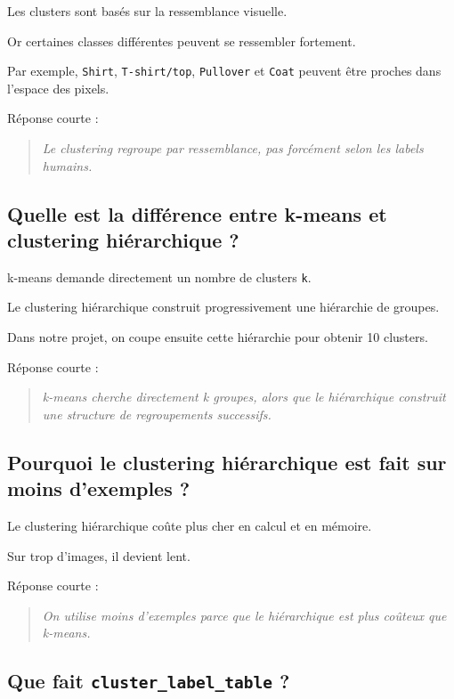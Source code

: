 \documentclass[11pt,a4paper]{article}
\begin{document}
Les clusters sont basés sur la ressemblance visuelle.

Or certaines classes différentes peuvent se ressembler fortement.

Par exemple, \texttt{Shirt}, \texttt{T-shirt/top}, \texttt{Pullover} et \texttt{Coat} peuvent être proches dans l'espace des pixels.

Réponse courte :

\begin{quote}
\itshape Le clustering regroupe par ressemblance, pas forcément selon les labels humains.
\end{quote}

\subsection{Quelle est la différence entre k-means et clustering hiérarchique ?}

k-means demande directement un nombre de clusters \texttt{k}.

Le clustering hiérarchique construit progressivement une hiérarchie de groupes.

Dans notre projet, on coupe ensuite cette hiérarchie pour obtenir 10 clusters.

Réponse courte :

\begin{quote}
\itshape k-means cherche directement k groupes, alors que le hiérarchique construit une structure de regroupements successifs.
\end{quote}

\subsection{Pourquoi le clustering hiérarchique est fait sur moins d'exemples ?}

Le clustering hiérarchique coûte plus cher en calcul et en mémoire.

Sur trop d'images, il devient lent.

Réponse courte :

\begin{quote}
\itshape On utilise moins d'exemples parce que le hiérarchique est plus coûteux que k-means.
\end{quote}

\subsection{Que fait \texttt{cluster\_label\_table} ?}
\end{document}
